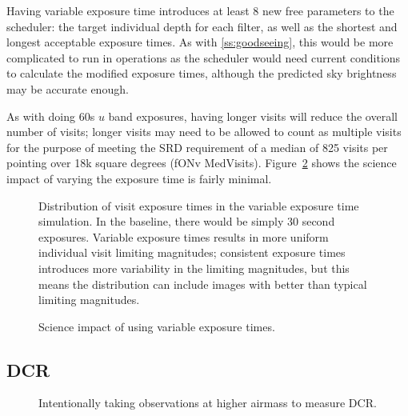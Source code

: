 Having variable exposure time introduces at least 8 new free parameters to the scheduler: the target individual depth for each filter, as well as the shortest and longest acceptable exposure times.  As with \ref{ss:goodseeing}, this would be more complicated to run in operations as the scheduler would need current conditions to calculate the modified exposure times, although the predicted sky brightness may be accurate enough.

As with doing 60s $u$ band exposures, having longer visits will reduce the overall number of visits; longer visits may need to be allowed to count as multiple visits for the purpose of meeting the SRD requirement of a median of 825 visits per pointing over 18k square degrees (fONv MedVisits).  Figure~\ref{fig:var_radar} shows the science impact of varying the exposure time is fairly minimal. 

\begin{figure}
\caption{Distribution of visit exposure times in the variable exposure time simulation. In the baseline, there would be simply 30 second exposures. Variable exposure times results in more uniform individual visit limiting magnitudes; consistent exposure times introduces more variability in the limiting magnitudes, but this means the distribution can include images with better than typical limiting magnitudes.}
\label{fig:varexpt_exptime}
\end{figure}

\begin{figure}
\caption{Science impact of using variable exposure times.}\label{fig:var_radar}
\end{figure}


\subsection{DCR}

\begin{figure}
\caption{Intentionally taking observations at higher airmass to measure DCR.}
\end{figure}


